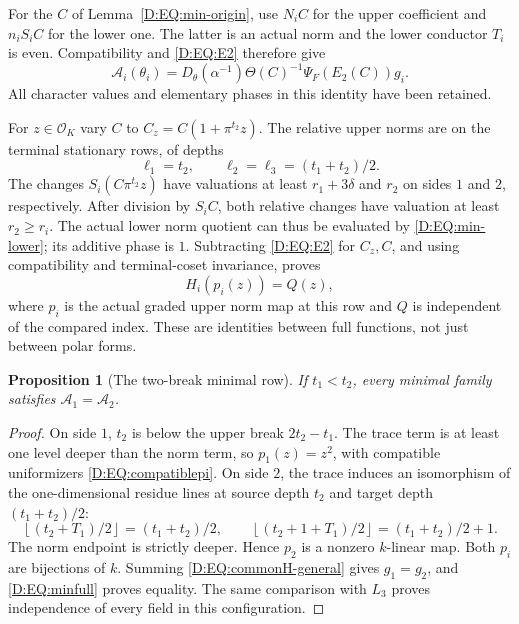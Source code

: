 \documentclass[11pt]{amsart}
\newtheorem{proposition}[theorem]{Proposition}
\theoremstyle{definition}
\theoremstyle{remark}
\newcommand{\floor}[1]{\left\lfloor #1\right\rfloor}
\newcommand{\OO}{\mathcal O}\newcommand{\pp}{\mathfrak p}\newcommand{\PP}{\mathfrak P}
\begin{document}
For the $C$ of Lemma~\ref{D:EQ:min-origin}, use $N_iC$ for the upper
coefficient and $n_iS_iC$ for the lower one. The latter is an actual
norm and the lower conductor $T_i$ is even. Compatibility and
\eqref{D:EQ:E2} therefore give
\begin{equation}\label{D:EQ:minfull}
 \mathcal A_i(\theta_i)
  =D_\theta(\alpha^{-1})\Theta(C)^{-1}
                       \Psi_F(E_2(C))g_i.
\end{equation}
All character values and elementary phases in this identity have been
retained.

For $z\in\OO_K$ vary $C$ to $C_z=C(1+\pi^{t_2}z)$.
The relative upper norms are on the terminal stationary rows, of
depths
\[
 \ell_1=t_2,\qquad \ell_2=\ell_3=(t_1+t_2)/2.
\]
The changes $S_i(C\pi^{t_2}z)$ have valuations at least
$r_1+3\delta$ and $r_2$ on sides $1$ and $2$, respectively.
After division by $S_iC$, both relative changes have valuation at
least $r_2\ge r_i$. The actual lower norm quotient can thus be evaluated
by \eqref{D:EQ:min-lower}; its additive phase is $1$.
Subtracting \eqref{D:EQ:E2} for $C_z,C$, and using compatibility and
terminal-coset invariance, proves
\begin{equation}\label{D:EQ:commonH-general}
 H_i(p_i(z))=Q(z),
\end{equation}
where $p_i$ is the actual graded upper norm map at this row and $Q$
is independent of the compared index. These are identities between
full functions, not just between polar forms.

\begin{proposition}[The two-break minimal row]\label{D:EQ:min-two}
If $t_1<t_2$, every minimal family satisfies $\mathcal A_1=\mathcal A_2$.
\end{proposition}
\begin{proof}
On side $1$, $t_2$ is below the upper break $2t_2-t_1$.
The trace term is at least one level deeper than the norm term, so
$p_1(z)=z^2$, with compatible uniformizers \eqref{D:EQ:compatiblepi}.
On side $2$, the trace induces an isomorphism of the one-dimensional
residue lines at source depth $t_2$ and target depth $(t_1+t_2)/2$:
\[
 \floor{(t_2+T_1)/2}=(t_1+t_2)/2,\qquad
 \floor{(t_2+1+T_1)/2}=(t_1+t_2)/2+1.
\]
The norm endpoint is strictly deeper. Hence $p_2$ is a nonzero
$k$-linear map. Both $p_i$ are bijections of $k$.
Summing \eqref{D:EQ:commonH-general} gives $g_1=g_2$, and
\eqref{D:EQ:minfull} proves equality. The same comparison with $L_3$
proves independence of every field in this configuration.
\end{proof}
\end{document}
